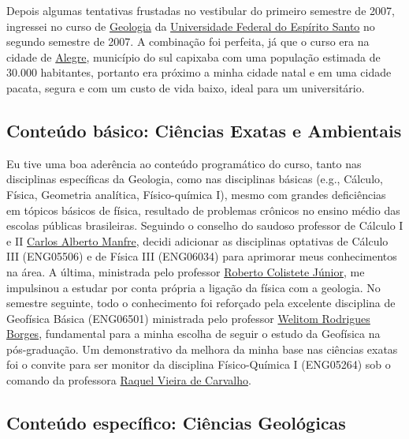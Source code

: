\documentclass[10pt,a4paper,oneside]{book}
\begin{document}
Depois algumas tentativas frustadas no vestibular do primeiro semestre de 2007, ingressei no curso de \href{https://geologia.ufes.br/}{Geologia} da \href{https://www.ufes.br/}{Universidade Federal do Espírito Santo} no segundo semestre de 2007. A combinação foi perfeita, já que o curso era na cidade de \href{https://alegre.es.gov.br/}{Alegre}, município do sul capixaba com uma população estimada de 30.000 habitantes, portanto era próximo a minha cidade natal e em uma cidade pacata, segura e com um custo de vida baixo, ideal para um universitário.

\subsection{Conteúdo básico: Ciências Exatas e Ambientais}
\label{sec_geo_basico}

Eu tive uma boa aderência ao conteúdo programático do curso, tanto nas disciplinas específicas da Geologia, como nas disciplinas básicas (e.g., Cálculo, Física, Geometria analítica, Físico-química I), mesmo com grandes deficiências em tópicos básicos de física, resultado de problemas crônicos no ensino médio das escolas públicas brasileiras. Seguindo o conselho do saudoso professor de Cálculo I e II \href{http://lattes.cnpq.br/8391815843000996}{Carlos Alberto Manfre}, decidi adicionar as disciplinas optativas de Cálculo III (ENG05506) e de Física III (ENG06034) para aprimorar meus conhecimentos na área. A última, ministrada pelo professor \href{http://lattes.cnpq.br/6503578618806955}{Roberto Colistete Júnior}, me impulsinou a estudar por conta própria a ligação da física com a geologia. No semestre seguinte, todo o conhecimento foi reforçado pela excelente disciplina de Geofísica Básica (ENG06501) ministrada pelo professor \href{http://lattes.cnpq.br/0799322864183147}{Welitom Rodrigues Borges}, fundamental para a minha escolha de seguir o estudo da Geofísica na pós-graduação. Um demonstrativo da melhora da minha base nas ciências exatas foi o convite para ser monitor da disciplina Físico-Química I (ENG05264) sob o comando da professora \href{http://lattes.cnpq.br/9146731989810239}{Raquel Vieira de Carvalho}.

\subsection{Conteúdo específico: Ciências Geológicas}
\label{sec_geo_especifico}
\end{document}
